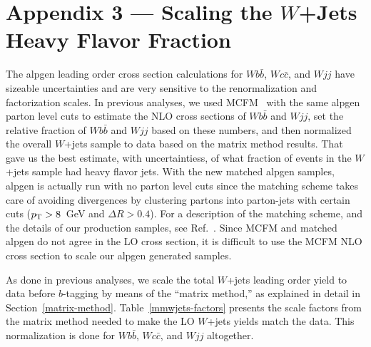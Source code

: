 %
\appendix
\section*{Appendix 3 --- Scaling the $W$+Jets Heavy Flavor Fraction}
\label{appendix-wjets-scaling}

The {\sc alpgen} leading order cross section calculations for
$Wb\bar{b}$, $Wc\bar{c}$, and $Wjj$ have sizeable uncertainties and
are very sensitive to the renormalization and factorization scales. In
previous analyses, we used MCFM~\cite{MCFM} with the same {\sc alpgen}
parton level cuts to estimate the NLO cross sections of $Wb\bar{b}$
and $Wjj$, set the relative fraction of $Wb\bar{b}$ and $Wjj$ based on
these numbers, and then normalized the overall $W$+jets sample to data
based on the matrix method results. That gave us the best estimate,
with uncertaintiess, of what fraction of events in the $W$+jets sample
had heavy flavor jets. With the new matched {\sc alpgen} samples, {\sc
alpgen} is actually run with no parton level cuts since the matching
scheme takes care of avoiding divergences by clustering partons into
parton-jets with certain cuts ($\mbox{$p_{\rm T}$}>8$~GeV and $\Delta R>0.4$). For a
description of the matching scheme, and the details of our production
samples, see Ref.~\cite{FOMEcs}. Since MCFM and matched {\sc alpgen}
do not agree in the LO cross section, it is difficult to use the MCFM
NLO cross section to scale our {\sc alpgen} generated samples.

As done in previous analyses, we scale the total $W$+jets leading
order yield to data before $b$-tagging by means of the ``matrix
method,'' as explained in detail in Section~\ref{matrix-method}.
Table~\ref{mmwjets-factors} presents the scale factors from the matrix
method needed to make the LO {\alpgen} $W$+jets yields match the
data. This normalization is done for $Wb\bar{b}$, $Wc\bar{c}$, and
$Wjj$ altogether.

